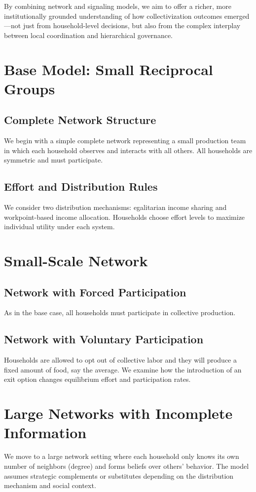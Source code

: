\documentclass[12pt]{article}
\begin{document}
By combining network and signaling models, we aim to offer a richer, more institutionally grounded understanding of how collectivization outcomes emerged—not just from household-level decisions, but also from the complex interplay between local coordination and hierarchical governance.
\section{Base Model: Small Reciprocal Groups}
\subsection{Complete Network Structure}
We begin with a simple complete network representing a small production team in which each household observes and interacts with all others. All households are symmetric and must participate.

\subsection{Effort and Distribution Rules}
We consider two distribution mechanisms: egalitarian income sharing and workpoint-based income allocation. Households choose effort levels to maximize individual utility under each system.

\section{Small-Scale Network}
\subsection{Network with Forced Participation}
As in the base case, all households must participate in collective production.

\subsection{Network with Voluntary Participation}
Households are allowed to opt out of collective labor and they will produce a fixed amount of food, say the average. We examine how the introduction of an exit option changes equilibrium effort and participation rates.

\section{Large Networks with Incomplete Information}
We move to a large network setting where each household only knows its own number of neighbors (degree) and forms beliefs over others' behavior. The model assumes strategic complements or substitutes depending on the distribution mechanism and social context.
\end{document}
